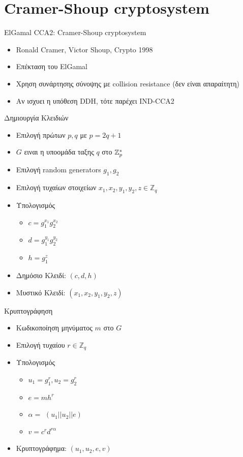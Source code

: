 \documentclass[handout]{beamer}
\begin{document}
\section{Cramer-Shoup cryptosystem}
\begin{frame}[allowframebreaks]{ElGamal CCA2: Cramer-Shoup cryptosystem}
\begin{itemize}
\item Ronald Cramer, Victor Shoup, Crypto 1998
\item Επέκταση του ElGamal
\item Χρηση συνάρτησης σύνοψης \hash με collision resistance  (δεν είναι απαραίτητη)
\item Αν ισχυει η υπόθεση DDH, τότε παρέχει IND-CCA2
\end{itemize}
\framebreak
\begin{block}{Δημιουργία Κλειδιών}
\begin{itemize}
\item Επιλογή πρώτων $p,q$ με $p=2q+1$
\item $G$ ειναι η υποομάδα ταξης $q$ στο $\mathbb{Z}^*_p$
\item Επιλογή random generators $g_1, g_2$

\item Επιλογή τυχαίων στοιχείων $x_1,x_2,y_1,y_2,z \in \mathbb{Z}_{q}$
\item Υπολογισμός
\begin{itemize} 
\item $c=g_1^{x_1}g_2^{x_2}$
\item $d=g_1^{y_1}g_2^{y_2}$
\item $h=g_1^{z}$
\end{itemize}
\item Δημόσιο Κλειδί: $(c,d,h)$
\item Μυστικό Κλειδί: $(x_1,x_2,y_1,y_2,z)$
\end{itemize}
\end{block}

\framebreak

\begin{block}{Κρυπτογράφηση}
\begin{itemize}
\item Κωδικοποίηση μηνύματος $m$ στο $G$
\item Επιλογή τυχαίου $r \in \mathbb{Z}_{q}$
\item Υπολογισμός
\begin{itemize} 
\item $u_1 = g_1^r,u_2 = g_2^r$
\item $e = m h^r$
\item $\alpha = $ \hash$(u_1||u_2||e)$
\item $v = c^r d^{r\alpha}$ 
\end{itemize}
\item Κρυπτογράφημα: $(u_1,u_2,e,v)$
\end{itemize}
\end{block}


\end{frame}
\end{document}
